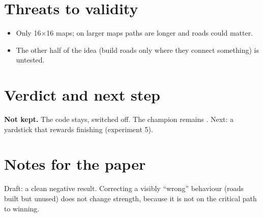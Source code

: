 \documentclass{../polyexp}
\begin{document}

\section{Threats to validity}
\begin{itemize}
\item Only 16$\times$16 maps; on larger maps paths are longer and roads could matter.
\item The other half of the idea (build roads only where they connect something) is untested.
\end{itemize}

\section{Verdict and next step}
\textbf{Not kept.} The code stays, switched off. The champion remains . Next: a yardstick that rewards finishing (experiment 5).

\section{Notes for the paper}
Draft: a clean negative result. Correcting a visibly ``wrong'' behaviour (roads built but unused) does not change strength, because it is not on the critical path to winning.

\end{document}
